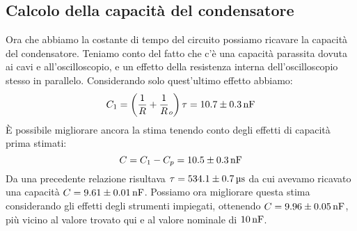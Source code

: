 \documentclass[italian,a4paper]{article}
\begin{document}
\subsection{Calcolo della capacità del condensatore}
Ora che abbiamo la costante di tempo del circuito possiamo ricavare la capacità del condensatore. Teniamo conto del fatto che c'è una capacità parassita dovuta ai cavi e all'oscilloscopio, e un effetto della resistenza interna dell'oscilloscopio stesso in parallelo. Considerando solo quest'ultimo effetto abbiamo:
\begin{equation*}
 C_1 = \left(\dfrac 1 R + \dfrac 1 R_o \right) \tau = \unit[10.7\pm0.3]{nF}
\end{equation*}
\`E possibile migliorare ancora la stima tenendo conto degli effetti di capacità prima stimati:
\begin{equation*}
 C = C_1 - C_p = \unit[10.5\pm0.3]{nF}
\end{equation*}
Da una precedente relazione risultava $\tau = \unit[534.1\pm0.7]{\micro s}$ da cui avevamo ricavato una capacità $C = \unit[9.61\pm0.01]{nF}$. Possiamo ora migliorare questa stima considerando gli effetti degli strumenti impiegati, ottenendo $C = \unit[9.96\pm0.05]{nF}$, più vicino al valore trovato qui e al valore nominale di $\unit[10]{nF}$.
\end{document}
